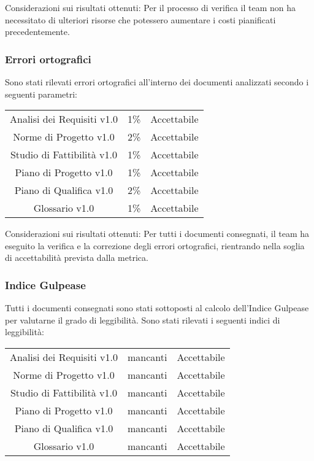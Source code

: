 
Considerazioni sui risultati ottenuti: Per il processo di verifica il team non ha necessitato di ulteriori risorse che potessero aumentare i costi pianificati precedentemente.


\subsubsection{Errori ortografici}
Sono stati rilevati errori ortografici all'interno dei documenti analizzati secondo i seguenti parametri:

\begin{center}
	\begin{tabular}{| c | C{1cm} | C{3cm} |}
		Analisi dei Requisiti v1.0 & 1\% & Accettabile \\
		Norme di Progetto v1.0 & 2\% & Accettabile\\
		Studio di Fattibilità v1.0 & 1\% &  Accettabile \\
		Piano di Progetto v1.0 & 1\% & Accettabile \\
		Piano di Qualifica v1.0 & 2\% & Accettabile\\
		Glossario v1.0 & 1\% & Accettabile\\
	\end{tabular}
\end{center}

    Considerazioni sui risultati ottenuti: Per tutti i documenti consegnati, il team ha eseguito la verifica e la correzione degli errori ortografici, rientrando nella soglia di accettabilità prevista dalla metrica.

\subsubsection{Indice Gulpease}

Tutti i documenti consegnati sono stati sottoposti al calcolo dell'Indice Gulpease per valutarne il grado di leggibilità.
Sono stati rilevati i seguenti indici di leggibilità:

\begin{center}
	\begin{tabular}{| c | C{3cm} | C{3cm} |}
		Analisi dei Requisiti v1.0 &  mancanti & Accettabile \\
		Norme di Progetto v1.0 & mancanti & Accettabile\\
		Studio di Fattibilità v1.0 & mancanti & Accettabile\\ 
		Piano di Progetto v1.0 & mancanti & Accettabile \\
		Piano di Qualifica v1.0 & mancanti & Accettabile\\
		Glossario v1.0 & mancanti & Accettabile\\
	 \end{tabular}
\end{center}

